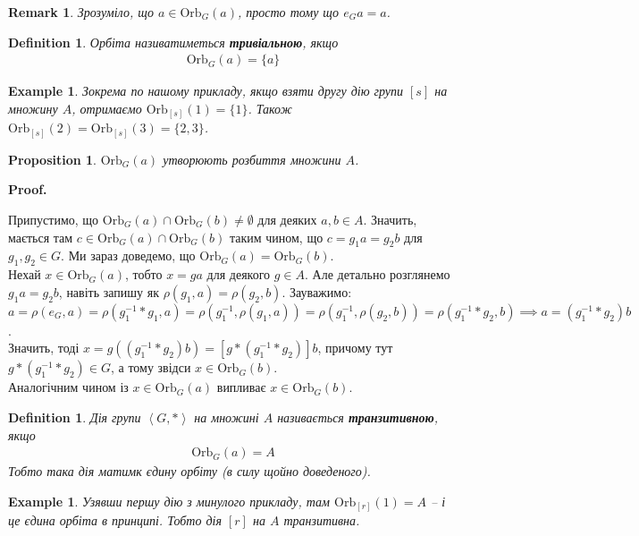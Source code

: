 \documentclass[a4paper, 10pt]{article}
\makeatletter
\theoremstyle{theoremdd}
\theoremstyle{theoremdd}
\newtheorem{definition}[theorem]{Definition}
\theoremstyle{theoremdd}
\theoremstyle{theoremdd}
\theoremstyle{theoremdd}
\newtheorem{example}[theorem]{Example}
\theoremstyle{theoremdd}
\theoremstyle{theoremdd}
\theoremstyle{theoremdd}
\theoremstyle{theoremdd}
\newtheorem{proposition}[theorem]{Proposition}
\theoremstyle{theoremdd}
\theoremstyle{theoremdd}
\newtheorem{remark}[theorem]{Remark}
\theoremstyle{theoremdd}
\theoremstyle{theoremdd}
\theoremstyle{theoremdd}
\theoremstyle{theoremdd}
\renewenvironment{proof}[1][Proof.\\]{\par
\pushQED{\hfill \qed}%
\normalfont \topsep6\p@\@plus6\p@\relax
\trivlist
\item\relax
{\bfseries
#1\@addpunct{.}}\hspace\labelsep\ignorespaces
}{%
\popQED\endtrivlist\@endpefalse
}
\newcommand\Orb{\text{Orb}}
\makeatother
\begin{document}
\begin{remark}
Зрозуміло, що $a \in \Orb_G(a)$, просто тому що $e_G a = a$.
\end{remark}

\begin{definition}
Орбіта називатиметься \textbf{тривіальною}, якщо
\begin{align*}
\Orb_G(a) = \{a\}
\end{align*}
\end{definition}

\begin{example}
Зокрема по нашому прикладу, якщо взяти другу дію групи $[s]$ на множину $A$, отримаємо $\Orb_{[s]}(1) = \{1\}$. Також $\Orb_{[s]}(2) = \Orb_{[s]}(3) = \{2,3\}$.
\end{example}

\begin{proposition}
$\Orb_G(a)$ утворюють розбиття множини $A$.
\end{proposition}

\begin{proof}
Припустимо, що $\Orb_G(a) \cap \Orb_G(b) \neq \emptyset$ для деяких $a,b \in A$. Значить, мається там $c \in \Orb_G(a) \cap \Orb_G(b)$ таким чином, що $c = g_1 a = g_2 b$ для $g_1,g_2 \in G$. Ми зараз доведемо, що $\Orb_G(a) = \Orb_G(b)$.\\
Нехай $x \in \Orb_G(a)$, тобто $x = ga$ для деякого $g \in A$. Але детально розглянемо $g_1 a = g_2 b$, навіть запишу як $\rho(g_1,a) = \rho(g_2,b)$. Зауважимо:\\
$a = \rho(e_G, a) = \rho(g_1^{-1}*g_1, a) = \rho(g_1^{-1}, \rho(g_1,a)) = \rho(g_1^{-1}, \rho(g_2,b)) = \rho(g_1^{-1}*g_2,b) \implies a = (g_1^{-1}*g_2) b$.\\
Значить, тоді $x = g((g_1^{-1}*g_2) b) = [g*(g_1^{-1}*g_2)] b$, причому тут $g*(g_1^{-1}*g_2) \in G$, а тому звідси $x \in \Orb_G(b)$.\\
Аналогічним чином із $x \in \Orb_G(a)$ випливає $x \in \Orb_G(b)$.
\end{proof}

\begin{definition}
Дія групи $\left< G,*\right>$ на множині $A$ називається \textbf{транзитивною}, якщо
\begin{align*}
\Orb_G(a) = A
\end{align*}
Тобто така дія матимк єдину орбіту (в силу щойно доведеного).
\end{definition}

\begin{example}
Узявши першу дію з минулого прикладу, там $\Orb_{[r]}(1) = A$ -- і це єдина орбіта в принципі. Тобто дія $[r]$ на $A$ транзитивна.
\end{example}
\end{document}
